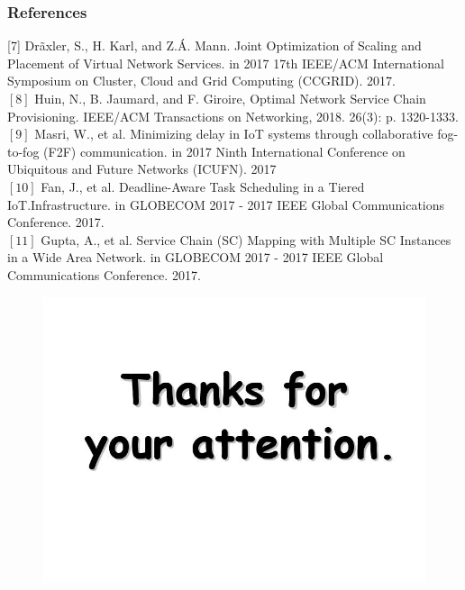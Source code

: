 \documentclass{beamer}
\begin{document}
\begin{frame}
\frametitle{References}
[7] Drãxler, S., H. Karl, and Z.Á. Mann. Joint Optimization of Scaling and
Placement of Virtual Network Services. in 2017 17th IEEE/ACM
International Symposium on Cluster, Cloud and Grid Computing
(CCGRID). 2017.\\
$[8]$ Huin, N., B. Jaumard, and F. Giroire, Optimal Network Service Chain
Provisioning. IEEE/ACM Transactions on Networking, 2018. 26(3): p.
1320-1333.\\
$[9]$ Masri, W., et al. Minimizing delay in IoT systems through collaborative
fog-to-fog (F2F) communication. in 2017 Ninth International
Conference on Ubiquitous and Future Networks (ICUFN). 2017\\
$[10]$ Fan, J., et al. Deadline-Aware Task Scheduling in a Tiered IoT.Infrastructure. in GLOBECOM 2017 - 2017 IEEE Global Communications Conference. 2017.\\
$[11]$ Gupta, A., et al. Service Chain (SC) Mapping with Multiple SC
Instances in a Wide Area Network. in GLOBECOM 2017 - 2017 IEEE
Global Communications Conference. 2017.
\end{frame}
\begin{frame}
	
\begin{figure}
	\centering
	\includegraphics[width=0.7\linewidth]{thanks}
		\label{fig:thanks}
\end{figure}
\end{frame}
\end{document}
